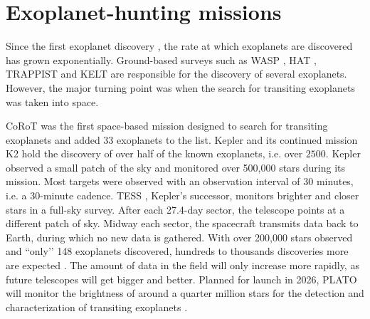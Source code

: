 
\section{Exoplanet-hunting missions}
\label{sec:missions}

Since the first exoplanet discovery \citep{wolszczan1992planetary}, the rate at which exoplanets are discovered has grown exponentially. Ground-based surveys such as WASP \citep{pollacco2006wasp}, HAT \citep{bakos2004wide}, TRAPPIST \citep{jehin2011trappist} and KELT \citep{pepper2007kilodegree} are responsible for the discovery of several exoplanets. However, the major turning point was when the search for transiting exoplanets was taken into space.

CoRoT \citep{auvergne2009corot} was the first space-based mission designed to search for transiting exoplanets and added 33 exoplanets to the list. Kepler \citep{koch2010kepler} and its continued mission K2 \citep{howell2014k2} hold the discovery of over half of the known exoplanets, i.e. over $2500$.
Kepler observed a small patch of the sky and monitored over 500,000 stars during its mission. Most targets were observed with an observation interval of 30 minutes, i.e. a 30-minute cadence. TESS \citep{ricker2014transiting}, Kepler’s successor, monitors brighter and closer stars in a full-sky survey. After each 27.4-day sector, the telescope points at a different patch of sky. Midway each sector, the spacecraft transmits data back to Earth, during which no new data is gathered. With over 200,000 stars observed and ``only’’ 148 exoplanets discovered, hundreds to thousands discoveries more are expected \citep{sullivan2015transiting}. The amount of data in the field will only increase more rapidly, as future telescopes will get bigger and better.
Planned for launch in 2026, PLATO will monitor the brightness of around a quarter million stars for the detection and characterization of transiting exoplanets \citep{rauer2021plato}.


